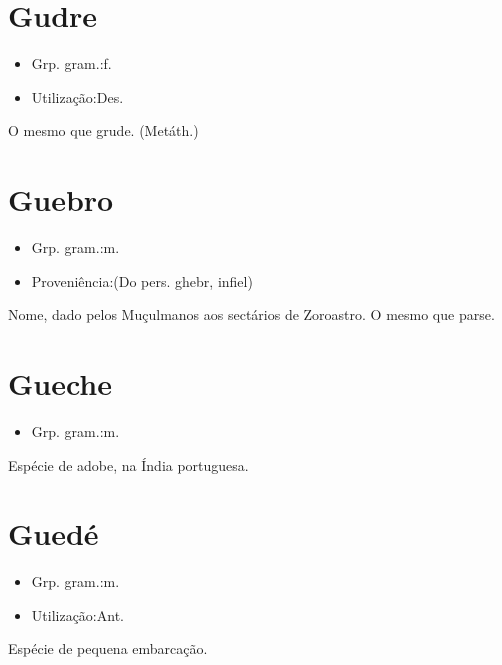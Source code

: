 \section{Gudre}
\begin{itemize}
\item {Grp. gram.:f.}
\end{itemize}
\begin{itemize}
\item {Utilização:Des.}
\end{itemize}
O mesmo que \textunderscore grude\textunderscore .
(Metáth.)
\section{Guebro}
\begin{itemize}
\item {Grp. gram.:m.}
\end{itemize}
\begin{itemize}
\item {Proveniência:(Do pers. \textunderscore ghebr\textunderscore , infiel)}
\end{itemize}
Nome, dado pelos Muçulmanos aos sectários de Zoroastro.
O mesmo que \textunderscore parse\textunderscore .
\section{Gueche}
\begin{itemize}
\item {Grp. gram.:m.}
\end{itemize}
Espécie de adobe, na Índia portuguesa.
\section{Guedé}
\begin{itemize}
\item {Grp. gram.:m.}
\end{itemize}
\begin{itemize}
\item {Utilização:Ant.}
\end{itemize}
Espécie de pequena embarcação.
